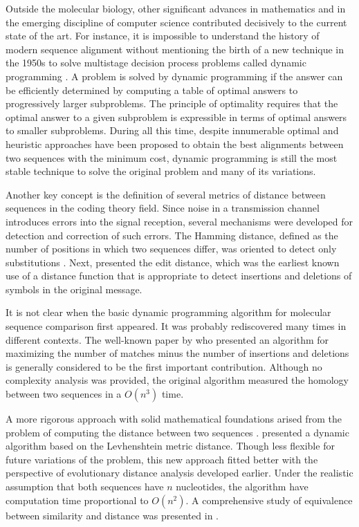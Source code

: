 Outside the molecular biology, other significant advances in mathematics and in the emerging discipline of
computer science contributed decisively to the current state of the art. For instance, it is impossible to 
understand the history of modern sequence alignment without mentioning the birth of a new technique in the
1950s to solve multistage decision process problems called dynamic programming \citep{bellman:1957a,dreyfus:2002a}. 
A problem is solved by dynamic programming if the answer can be efficiently determined by computing a table of 
optimal answers to progressively larger subproblems. The principle of optimality requires that the optimal answer 
to a given subproblem is expressible in terms of optimal answers to smaller subproblems. During all this time, 
despite innumerable optimal and heuristic approaches have been proposed to obtain the best alignments between 
two sequences with the minimum cost, dynamic programming is still the most stable technique to solve the original 
problem and many of its variations.

Another key concept is the definition of several metrics of distance between sequences in the coding 
theory field. Since noise in a transmission channel introduces errors into the signal reception, several
mechanisms were developed for detection and correction of such errors. The Hamming distance, defined as the 
number of positions in which two sequences differ, was oriented to detect only substitutions \citep{hamming:1950a}. 
Next, \citet{levhenshtein:1966a} presented the edit distance, which was the earliest known use of a distance 
function that is appropriate to detect insertions and deletions of symbols in the original message.
 
It is not clear when the basic dynamic programming algorithm for molecular sequence comparison first 
appeared. It was probably rediscovered many times in different contexts. The well-known paper by
\citet{needleman:1970a} who presented an algorithm for maximizing the number of matches minus the number
of insertions and deletions is generally considered to be the first important contribution. Although no 
complexity analysis was provided, the original \citeauthor{needleman:1970a} algorithm measured the
homology between two sequences in a $O(n^3)$ time.

A more rigorous approach with solid mathematical foundations arised from the problem of computing the 
distance between two sequences \citep{ulam:1972a,beyer:1985a}. \citet{sellers:1974a} presented a dynamic
algorithm based on the Levhenshtein metric distance. Though less flexible for future variations of the 
problem, this new approach fitted better with the perspective of evolutionary distance analysis 
developed earlier. Under the realistic assumption that both sequences have $n$ nucleotides, the 
\citeauthor{sellers:1974a} algorithm have computation time proportional to $O(n^2)$. A comprehensive 
study of equivalence between similarity and distance was presented in \citet{smith:1981b}. 

